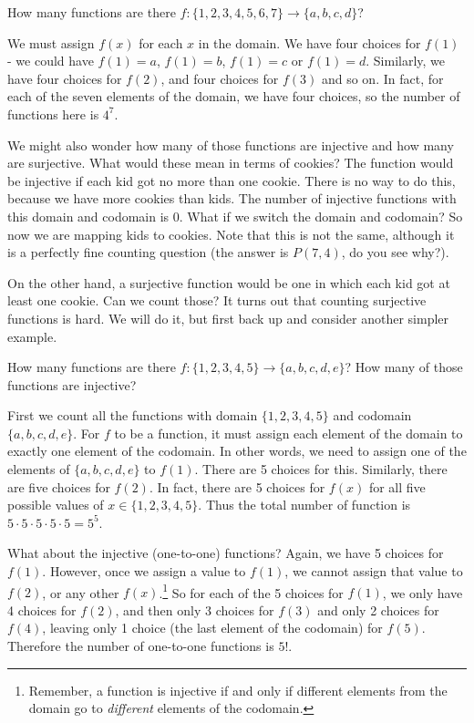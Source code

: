 \documentclass[12pt]{article}
\begin{document}
\begin{example}
 How many functions are there $f: \{1,2,3,4,5,6,7\} \to \{a,b,c,d\}$?
 \begin{solution}
 	We must assign $f(x)$ for each $x$ in the domain.  We have four choices for $f(1)$ - we could have $f(1) = a$, $f(1) = b$, $f(1) = c$ or $f(1) = d$.  Similarly, we have four choices for $f(2)$, and four choices for $f(3)$ and so on.  In fact, for each of the seven elements of the domain, we have four choices, so the number of functions here is $4^7$.  
 \end{solution}
\end{example}

We might also wonder how many of those functions are injective and how many are surjective.  What would these mean in terms of cookies?  The function would be injective if each kid got no more than one cookie.  There is no way to do this, because we have more cookies than kids.  The number of injective functions with this domain and codomain is 0.  What if we switch the domain and codomain?  So now we are mapping kids to cookies.  Note that this is not the same, although it is a perfectly fine counting question (the answer is $P(7,4)$, do you see why?). 

On the other hand, a surjective function would be one in which each kid got at least one cookie.  Can we count those? It turns out that counting surjective functions is hard.  We will do it, but first back up and consider another simpler example.

\begin{example}
  How many functions are there $f: \{1,2,3,4,5\} \to \{a,b,c,d,e\}$?  How many of those functions are injective? 
  \begin{solution}
    First we count all the functions with domain $\{1,2,3,4,5\}$ and codomain $\{a,b,c,d,e\}$.  For $f$ to be a function, it must assign each element of the domain to exactly one element of the codomain.  In other words, we need to assign one of the elements of $\{a,b,c,d,e\}$ to $f(1)$.  There are 5 choices for this.  Similarly, there are five choices for $f(2)$.  In fact, there are 5 choices for $f(x)$ for all five possible values of $x \in \{1,2,3,4,5\}$.  Thus the total number of function is $5 \cdot 5 \cdot 5 \cdot 5 \cdot 5 = 5^5$.
    
    What about the injective (one-to-one) functions?  Again, we have 5 choices for $f(1)$.  However, once we assign a value to $f(1)$, we cannot assign that value to $f(2)$, or any other $f(x)$.\footnote{Remember, a function is injective if and only if different elements from the domain go to {\em different} elements of the codomain.} So for each of the 5 choices for $f(1)$, we only have 4 choices for $f(2)$, and then only 3 choices for $f(3)$ and only 2 choices for $f(4)$, leaving only 1 choice (the last element of the codomain) for $f(5)$.  Therefore the number of one-to-one functions is $5!$.
  \end{solution}

\end{example}
\end{document}
